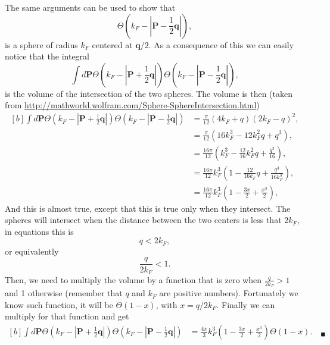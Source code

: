 \begin{questions}
\begin{solution}
The same arguments can be used to show that
\begin{equation*}
  \Theta(k_F - |\bm{P} -\frac{1}{2}\bm{q}|),
\end{equation*}
is a sphere of radius $k_F$ centered at $\bm{q}/2$. As a consequence of this we can easily notice that the integral
\begin{equation}
  \int d\bm{P}\Theta(k_F - |\bm{P} +\frac{1}{2}\bm{q}|)\Theta(k_F - |\bm{P} -\frac{1}{2}\bm{q}|),
\end{equation}
is the volume of the intersection of the two spheres. The volume is then (taken from \url{http://mathworld.wolfram.com/Sphere-SphereIntersection.html})
\begin{equation*}
  \begin{aligned}[b]
  \int d\bm{P}\Theta(k_F - |\bm{P} +\frac{1}{2}\bm{q}|)\Theta(k_F - |\bm{P} -\frac{1}{2}\bm{q}|) &= \frac{\pi}{12}(4k_F +q)(2k_F-q)^2, \\
  &= \frac{\pi}{12}(16k_F^3 - 12k_F^2q+q^3),\\
  &= \frac{16\pi}{12}(k_F^3 - \frac{12}{16}k_F^2q+\frac{q^3}{16}),\\
  &= \frac{16\pi}{12}k_F^3(1 - \frac{12}{16k_F}q+\frac{q^3}{16k_F^3}),\\
  &= \frac{16\pi}{12}k_F^3(1 - \frac{3x}{2}+\frac{x^3}{2}),
\end{aligned}
\end{equation*}
And this is almost true, except that this is true only when they intersect. The spheres will intersect when the distance between the two centers is less that $2k_F$, in equations this is
\begin{equation*}
  q < 2k_F,
\end{equation*}
or equivalently
\begin{equation}
  \frac{q}{2k_F} < 1.
\end{equation}
Then, we need to multiply the volume by a function that is zero when $\frac{q}{2k_F} > 1$ and 1 otherwise (remember that $q$ and $k_F$ are positive numbers). Fortunately we know such function, it will be $\Theta(1-x)$, with $x=q/2k_F$. Finally we can multiply for that function and get
\begin{equation}
  \begin{aligned}[b]
  \int d\bm{P}\Theta(k_F - |\bm{P} +\frac{1}{2}\bm{q}|)\Theta(k_F - |\bm{P} -\frac{1}{2}\bm{q}|)   &= \frac{4\pi}{3}k_F^3(1 - \frac{3x}{2}+\frac{x^3}{2})\Theta(1-x). \quad_\blacksquare
\end{aligned}
\label{sp:inter}
\end{equation}

\end{solution}
\end{questions}
